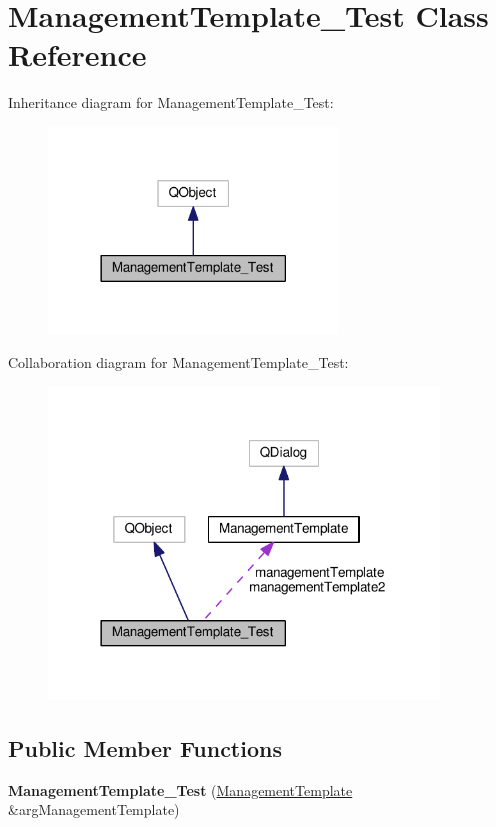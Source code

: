 \hypertarget{class_management_template___test}{}\section{Management\+Template\+\_\+\+Test Class Reference}
\label{class_management_template___test}


Inheritance diagram for Management\+Template\+\_\+\+Test\+:
\nopagebreak
\begin{figure}[H]
\begin{center}
\leavevmode
\includegraphics[width=218pt]{class_management_template___test__inherit__graph}
\end{center}
\end{figure}


Collaboration diagram for Management\+Template\+\_\+\+Test\+:
\nopagebreak
\begin{figure}[H]
\begin{center}
\leavevmode
\includegraphics[width=294pt]{class_management_template___test__coll__graph}
\end{center}
\end{figure}
\subsection*{Public Member Functions}
\begin{DoxyCompactItemize}
\item 
{\bfseries Management\+Template\+\_\+\+Test} (\hyperlink{class_management_template}{Management\+Template} \&arg\+Management\+Template)\hypertarget{class_management_template___test_a4c6f8a0f1e5748aace7197a414a56720}{}\label{class_management_template___test_a4c6f8a0f1e5748aace7197a414a56720}

\end{DoxyCompactItemize}
